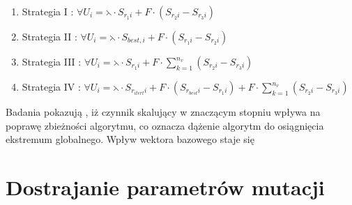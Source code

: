 \begin{enumerate}
\item Strategia I : $ \forall U_{i} = \leftthreetimes \cdot S_{r_{1}i} + F \cdot (S_{r_{2}i} - S_{r_{3}i})$
\item Strategia II : $ \forall U_{i} = \leftthreetimes \cdot  S_{best,i} + F \cdot (S_{r_{1}i} - S_{r_{2}i}) $
\item Strategia III : $ \forall U_{i} = \leftthreetimes \cdot  S_{r_{1}i} +  F \cdot \sum_{k=1}^{n_{v}}(S_{r_{2}i} - S_{r_{3}i}) $
\item Strategia IV : $ \forall U_{i} = \leftthreetimes \cdot S_{r_{itert}i} +  F \cdot (S_{r_{best}i} - S_{r_{1}i}) +  F \cdot \sum_{k=1}^{n_{v}}(S_{r_{2}i} - S_{r_{3}i}) $
\end{enumerate}
\par
Badania pokazują \cite{czynnik}, iż czynnik skalujący w znaczącym stopniu wpływa na poprawę zbieżności algorytmu, co oznacza dążenie algorytm do osiągnięcia ekstremum globalnego. Wpływ wektora bazowego staje się 





































\section{Dostrajanie parametrów mutacji}\label{sec:kompilacja}